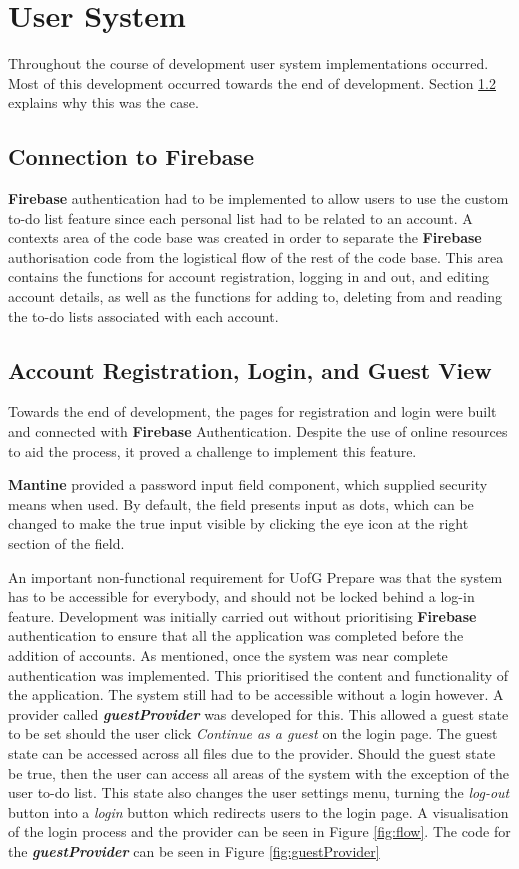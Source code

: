 \documentclass{l4proj}
\begin{document}
\section{User System}
Throughout the course of development user system implementations occurred. Most of this development occurred towards the end of development. Section \ref{GuestView} explains why this was the case.

\subsection{Connection to Firebase}
\textbf{Firebase} authentication had to be implemented to allow users to use the custom to-do list feature since each personal list had to be related to an account. A contexts area of the code base was created in order to separate the \textbf{Firebase} authorisation code from the logistical flow of the rest of the code base. This area contains the functions for account registration,  logging in and out,  and editing account details,  as well as the functions for adding to,  deleting from and reading the to-do lists associated with each account.

\subsection{Account Registration,  Login,  and Guest View} \label{GuestView}
Towards the end of development,  the pages for registration and login were built and connected with \textbf{Firebase} Authentication. Despite the use of online resources to aid the process,  it proved a challenge to implement this feature.

\textbf{Mantine} provided a password input field component,  which supplied security means when used. By default,  the field presents input as dots,  which can be changed to make the true input visible by clicking the eye icon at the right section of the field.

An important non-functional requirement for UofG Prepare was that the system has to be accessible for everybody,  and should not be locked behind a log-in feature. Development was initially carried out without prioritising \textbf{Firebase} authentication to ensure that all the application was completed before the addition of accounts. As mentioned,  once the system was near complete authentication was implemented. This prioritised the content and functionality of the application. The system still had to be accessible without a login however. A provider called \textit{\textbf{guestProvider}} was developed for this. This allowed a guest state to be set should the user click \textit{Continue as a guest} on the login page. The guest state can be accessed across all files due to the provider. Should the guest state be true,  then the user can access all areas of the system with the exception of the user to-do list. This state also changes the user settings menu,  turning the \textit{log-out} button into a \textit{login} button which redirects users to the login page. A visualisation of the login process and the provider can be seen in Figure \ref{fig:flow}. The code for the \textbf{\textit{guestProvider}} can be seen in Figure \ref{fig:guestProvider}
\end{document}
